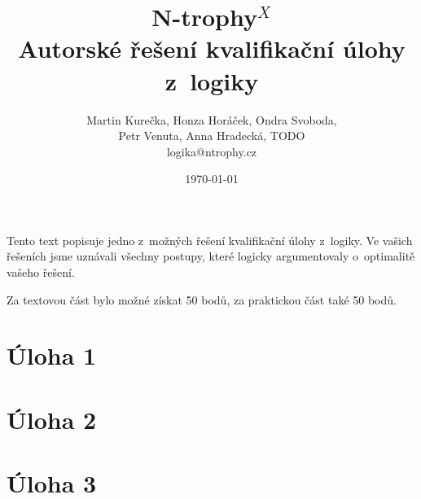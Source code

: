 \documentclass[12pt,a4paper]{article}
\begin{document}
\pagestyle{fancy}
\setcounter{page}{1}


\title{N-trophy$^X$\\Autorské řešení kvalifikační úlohy z~logiky}
\date{\today}
\author{Martin Kurečka, Honza Horáček, Ondra Svoboda, \\ Petr Venuta, Anna Hradecká, TODO \\
logika@ntrophy.cz}
\maketitle

\setlength{\parindent}{0cm}
\setlength{\parskip}{3mm plus2pt minus2pt}

Tento text popisuje jedno z~možných řešení kvalifikační úlohy z~logiky. Ve
vašich řešeních jsme uznávali všechny postupy, které logicky argumentovaly
o~optimalitě vašeho řešení.

Za textovou část bylo možné získat 50 bodů, za praktickou část také 50 bodů.

\section{Úloha 1}

\section{Úloha 2}

\section{Úloha 3}
\end{document}
